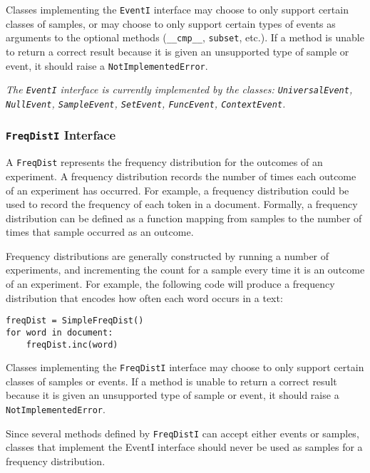 \documentclass{article}
\begin{document}
    Classes implementing the \texttt{EventI} interface may choose
    to only support certain classes of samples, or may choose to only
    support certain types of events as arguments to the optional
    methods (\texttt{\_\_cmp\_\_}, \texttt{subset}, etc.).  If a
    method is unable to return a correct result because it is given an 
    unsupported type of sample or event, it should raise a
    \texttt{NotImplementedError}.

\vspace{2mm}\noindent
\textit{The \texttt{EventI} interface is currently implemented by the
classes: \texttt{UniversalEvent}, \texttt{NullEvent},
\texttt{SampleEvent}, \texttt{SetEvent}, \texttt{FuncEvent},
\texttt{ContextEvent}.}

\subsubsection{\texttt{FreqDistI} Interface}

    A \texttt{FreqDist} represents the frequency distribution for the
    outcomes of an experiment.  A frequency distribution records the
    number of times each outcome of an experiment has occurred.  For
    example, a frequency distribution could be used to record the
    frequency of each token in a document.  Formally, a frequency
    distribution can be defined as a function mapping from samples to
    the number of times that sample occurred as an outcome.

    Frequency distributions are generally constructed by running a
    number of experiments, and incrementing the count for a sample
    every time it is an outcome of an experiment.  For example, the
    following code will produce a frequency distribution that encodes
    how often each word occurs in a text:
    
\begin{verbatim}
freqDist = SimpleFreqDist()
for word in document:
    freqDist.inc(word)
\end{verbatim}

    Classes implementing the \texttt{FreqDistI} interface may
    choose to only support certain classes of samples or events.  If a
    method is unable to return a correct result because it is given an
    unsupported type of sample or event, it should raise a
    \texttt{NotImplementedError}.

    Since several methods defined by \texttt{FreqDistI} can accept
    either events or samples, classes that implement the EventI
    interface should never be used as samples for a frequency
    distribution.
\end{document}
